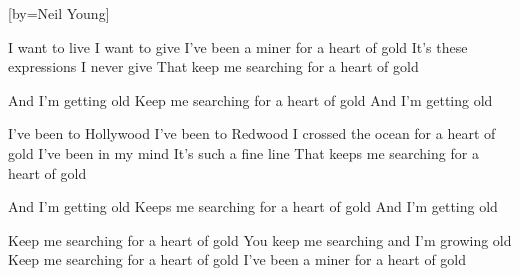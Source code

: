 

[by=Neil Young]

\begin{LARGE}


\beginverse
I want to live
I want to give
I've been a miner for a heart of gold
It's these expressions
I never give
That keep me searching for a heart of gold
\endverse

\beginverse
And I'm getting old
Keep me searching for a heart of gold
And I'm getting old
\endverse

\beginverse
I've been to Hollywood
I've been to Redwood
I crossed the ocean for a heart of gold
I've been in my mind
It's such a fine line
That keeps me searching for a heart of gold
\endverse

\beginverse
And I'm getting old
Keeps me searching for a heart of gold
And I'm getting old
\endverse

\beginverse
Keep me searching for a heart of gold
You keep me searching and I'm growing old
Keep me searching for a heart of gold
I've been a miner for a heart of gold
\endverse



\end{LARGE}


\chordson
\endsong
